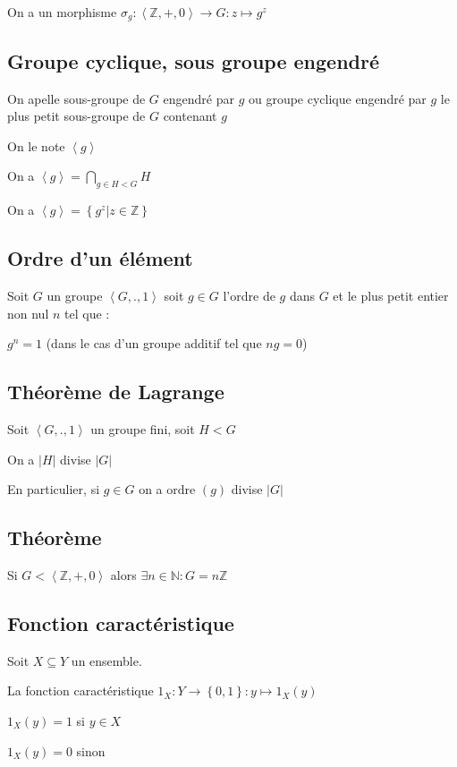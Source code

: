 \documentclass[a4paper,10pt]{article}
\newcommand{\card}[1]{\left\vert #1 \right\vert}
\newcommand{\grp}[1]{\left\langle #1 \right\rangle}
\newcommand{\ap}{\rightarrow}
\newcommand{\N}{\mathbb{N}}
\newcommand{\Z}{\mathbb{Z}}
\newcommand{\tset}[1]{\left\lbrace #1 \right\rbrace}
\newcommand{\ordre}{\mbox{ordre }}
\begin{document}
On a un morphisme $\sigma_g : \grp{\Z, +, 0} \ap G : z \mapsto g^z$

\subsection{Groupe cyclique, sous groupe engendré}

On apelle sous-groupe de $G$ engendré par $g$ ou groupe cyclique engendré par $g$ le plus petit sous-groupe de $G$ contenant $g$ 

On le note $\grp{g}$ 

On a $\grp{g} = \bigcap\limits_{g \in H < G} H$ 

On a $\grp{g} = \tset{g^z \vert z \in \Z}$

\subsection{Ordre d'un élément}

Soit $G$ un groupe $\grp{G,.,1}$ soit $g\in G$ l'ordre de $g$ dans $G$ et le plus petit entier non nul $n$ tel que :

$g^n = 1$ (dans le cas d'un groupe additif tel que $ng = 0$)


\subsection{Théorème de Lagrange}

Soit $\grp{G,.,1}$ un groupe fini, soit $H < G$

On a $\card{H}$ divise $\card{G}$

En particulier, si $g \in G$ on a $\ordre(g)$ divise $\card{G}$

\subsection{Théorème}

Si $G < \grp{\Z,+,0}$ alors $\exists n \in \N : G = n \Z$

\subsection{Fonction caractéristique}

Soit $X \subseteq Y$ un ensemble. 

La fonction caractéristique $1_X : Y \ap \tset{0,1} : y \mapsto 1_X(y)$

$1_X(y) = 1$ si $y \in X$

$1_X(y) = 0$ sinon
\end{document}
